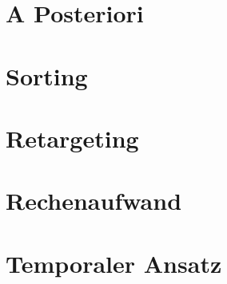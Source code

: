 \newpage
\newpage
\section{A Posteriori}
\label{ch:Content2:sec:a Posteriori}




\newpage
\newpage
\section{Sorting}
\label{ch:Content2:sec:Sorting}




\newpage
\newpage
\section{Retargeting}
\label{ch:Content2:sec:Retargeting}



\newpage
\section{Rechenaufwand}
\label{ch:Content2:sec:Rechenaufwand}


\newpage
\section{Temporaler Ansatz}
\label{ch:Content2:sec:Temporaler Ansatz}




